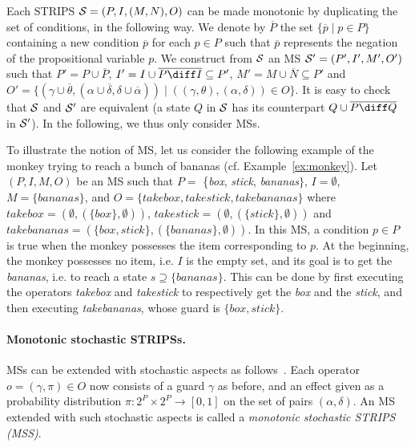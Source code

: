 \noindent
Each STRIPS ${\cal S} = (P, I, (M, N), O)$ can be made monotonic by duplicating the set of conditions, in the following way. We denote by $\overline{P}$ the set $\{\overline{p} \mid p \in P\}$ containing a new condition $\overline{p}$ for each $p \in P$ such that $\overline{p}$ represents the negation of the propositional variable $p$. We construct from $\cal S$ an MS ${\cal S}' = (P', I', M', O')$ such that $P' = P \cup \overline{P}$, $I' = I \cup \overline{P\diff I}\subseteq P'$, $M' = M \cup \overline{N} \subseteq P'$ and $O' = \{(\gamma \cup \overline{\theta}, (\alpha \cup \overline{\delta}, \delta \cup \overline{\alpha})) \mid ((\gamma, \theta), (\alpha, \delta)) \in O\}$. It is easy to check that ${\cal S}$ and ${\cal S}'$ are equivalent (a state $Q$ in ${\cal S}$ has its counterpart $Q \cup \overline{P\diff Q}$ in ${\cal S}'$). In the following, we thus only consider MSs. 

\begin{example} \label{ex:ST}
To illustrate the notion of MS, let us consider the following example of the monkey trying to reach a bunch of bananas (cf. Example~\ref{ex:monkey}). Let $(P, I, M, O)$ be an MS such that $P =$ \{\textit{box}, \textit{stick}, \textit{bananas}$\}$, $I = \emptyset$, $M = \{\textit{bananas}\}$, and $O = \{\textit{takebox}, \textit{takestick}, \textit{takebananas}\}$ where $\textit{takebox} = (\emptyset, (\{\textit{box}\}, \emptyset))$,  $\textit{takestick} = (\emptyset, (\{\textit{stick}\}, \emptyset))$ and $\textit{takebananas} = (\{\textit{box},\textit{stick}\}, (\{\textit{bananas}\}, \emptyset))$. In this MS, a condition $p \in P$ is true when the monkey possesses the item corresponding to $p$. At the beginning, the monkey possesses no item, i.e. $I$ is the empty set, and its goal is to get the \textit{bananas}, i.e. to reach a state $s \supseteq \{\textit{bananas}\}$. This can be done by first executing the operators \textit{takebox} and \textit{takestick} to respectively get the \textit{box} and the \textit{stick}, and then executing \textit{takebananas}, whose guard is $\{\textit{box}, \textit{stick}\}$.
\end{example}


\paragraph{Monotonic stochastic STRIPSs.} MSs can be extended with stochastic aspects as follows~\cite{blum2000probabilistic}. Each operator $o = (\gamma, \pi) \in O$ now consists of a guard $\gamma$ as before, and an effect given as a probability distribution $\pi : 2^P\times 2^P \rightarrow [0,1]$ on the set of pairs $(\alpha, \delta)$. An MS extended with such stochastic aspects is called a \textit{monotonic stochastic STRIPS (MSS)}. 

